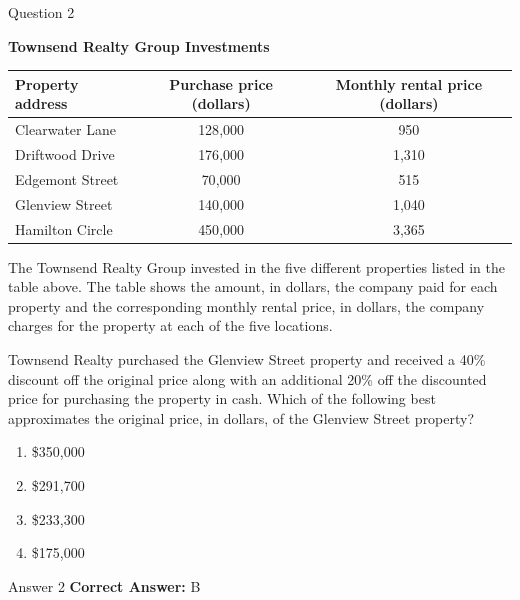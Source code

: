 \documentclass{beamer}
\begin{document}
\begin{frame}{Question 2}
\small
\begin{center}
\textbf{Townsend Realty Group Investments}

\renewcommand{\arraystretch}{1.3}
\begin{tabular}{|l|c|c|}
\hline
\textbf{Property address} & \textbf{Purchase price (dollars)} & \textbf{Monthly rental price (dollars)} \\
\hline
Clearwater Lane & 128{,}000 & 950 \\
Driftwood Drive & 176{,}000 & 1{,}310 \\
Edgemont Street & 70{,}000 & 515 \\
Glenview Street & 140{,}000 & 1{,}040 \\
Hamilton Circle & 450{,}000 & 3{,}365 \\
\hline
\end{tabular}
\end{center}

The Townsend Realty Group invested in the five different properties listed in the table above. The table shows the amount, in dollars, the company paid for each property and the corresponding monthly rental price, in dollars, the company charges for the property at each of the five locations.

Townsend Realty purchased the Glenview Street property and received a 40\% discount off the original price along with an additional 20\% off the discounted price for purchasing the property in cash. Which of the following best approximates the original price, in dollars, of the Glenview Street property?
\vspace{0.35cm}
\begin{enumerate}
    \item[A.] \$350{,}000
    \item[B.] \$291{,}700
    \item[C.] \$233{,}300
    \item[D.] \$175{,}000
\end{enumerate}
\end{frame}
\begin{frame}{Answer 2}
\small
\textbf{Correct Answer:} B
\end{frame}
\end{document}
